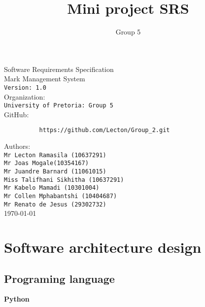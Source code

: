 \documentclass[10pt,a4paper]{article}
\author{Group 5}
\title{Mini project SRS}
\begin{document}
\begin{titlepage}
\begin{center}

\huge Software Requirements Specification\\[0.15cm]
\huge Mark Management System\\[0.15cm]
\large \texttt{Version: 1.0}\\[1cm]

Organization:\\
\texttt{University of Pretoria: Group 5}\\[0.5cm]
GitHub:\\[0.01cm]
\begin{verbatim}
          https://github.com/Lecton/Group_2.git
\end{verbatim}

Authors:\\
\texttt{Mr Lecton Ramasila (10637291)\\
        Mr Joas Mogale(10354167)\\
        Mr Juandre Barnard  (11061015)\\
        Miss Talifhani Sikhitha (10637291)\\
        Mr Kabelo Mamadi (10301004)\\
        Mr Collen Mphabantshi (10404687)\\
        Mr Renato de Jesus (29302732)}\\[1cm]
        
\today
\end{center}
\end{titlepage}


\tableofcontents
\pagebreak
\section{Software architecture design}

\subsection{Programing language}
\textbf{Python}
\end{document}
